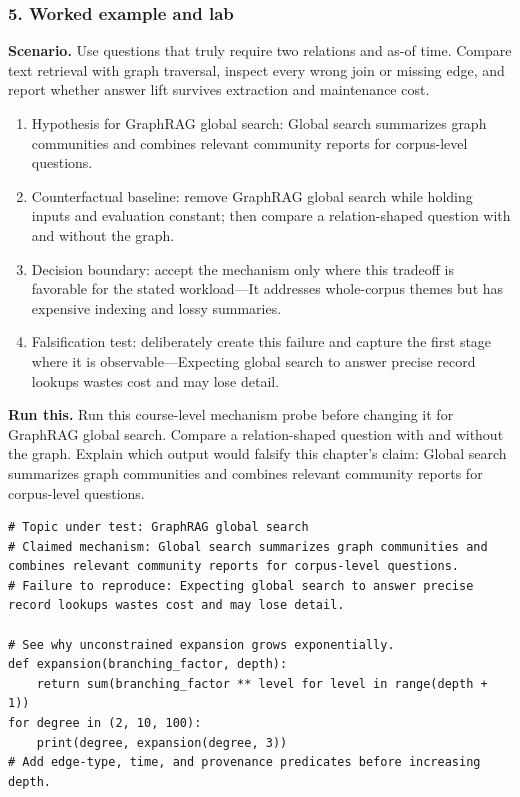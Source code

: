 \subsubsection*{5. Worked example and lab}
\textbf{Scenario.} Use questions that truly require two relations and as-of time. Compare text retrieval with graph traversal, inspect every wrong join or missing edge, and report whether answer lift survives extraction and maintenance cost.
\begin{enumerate}
\item Hypothesis for GraphRAG global search: Global search summarizes graph communities and combines relevant community reports for corpus-level questions.
\item Counterfactual baseline: remove GraphRAG global search while holding inputs and evaluation constant; then compare a relation-shaped question with and without the graph.
\item Decision boundary: accept the mechanism only where this tradeoff is favorable for the stated workload—It addresses whole-corpus themes but has expensive indexing and lossy summaries.
\item Falsification test: deliberately create this failure and capture the first stage where it is observable—Expecting global search to answer precise record lookups wastes cost and may lose detail.
\end{enumerate}
\textbf{Run this.} Run this course-level mechanism probe before changing it for GraphRAG global search. Compare a relation-shaped question with and without the graph. Explain which output would falsify this chapter's claim: Global search summarizes graph communities and combines relevant community reports for corpus-level questions.
\begin{Verbatim}[fontsize=\scriptsize]
# Topic under test: GraphRAG global search
# Claimed mechanism: Global search summarizes graph communities and combines relevant community reports for corpus-level questions.
# Failure to reproduce: Expecting global search to answer precise record lookups wastes cost and may lose detail.

# See why unconstrained expansion grows exponentially.
def expansion(branching_factor, depth):
    return sum(branching_factor ** level for level in range(depth + 1))
for degree in (2, 10, 100):
    print(degree, expansion(degree, 3))
# Add edge-type, time, and provenance predicates before increasing depth.
\end{Verbatim}
